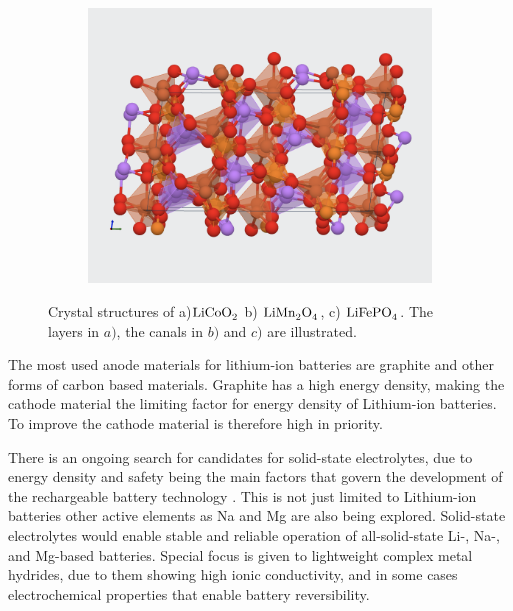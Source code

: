 \begin{figure}[H]
\begin{subfigure}{0.30\textwidth}
        \includegraphics[width=\linewidth]{LiFePO4.png}
        \caption{}
        \label{fig:LiFePO4}
    \end{subfigure}
	\caption{Crystal structures of a)$\ce{LiCoO_2}$\cite{wiki:LiCoO2} b) $\ce{LiMn_2O_4}$\cite{zhang2013understanding}, c) $\ce{LiFePO_4}$\cite{materialsproject:LiFePO4}. The layers in $a)$, the canals in $b)$ and $c)$ are illustrated.}
	\label{fig:Li_a-c}
\end{figure}

The most used anode materials for lithium-ion batteries are graphite and other forms of carbon based materials. Graphite has a high energy density, making the cathode material the limiting factor for energy density of Lithium-ion batteries. To improve the cathode material is therefore high in priority. 

There is an ongoing search for candidates for solid-state electrolytes, due to energy density and safety being the main factors that govern the development of the rechargeable battery technology \cite{guzik2019lightweight}. This is not just limited to Lithium-ion batteries other active elements as Na and Mg are also being explored. Solid-state electrolytes would enable stable and reliable operation of all-solid-state Li-, Na-, and Mg-based batteries. Special focus is given to lightweight complex metal hydrides, due to them showing high ionic conductivity, and in some cases electrochemical properties that enable battery reversibility. 


